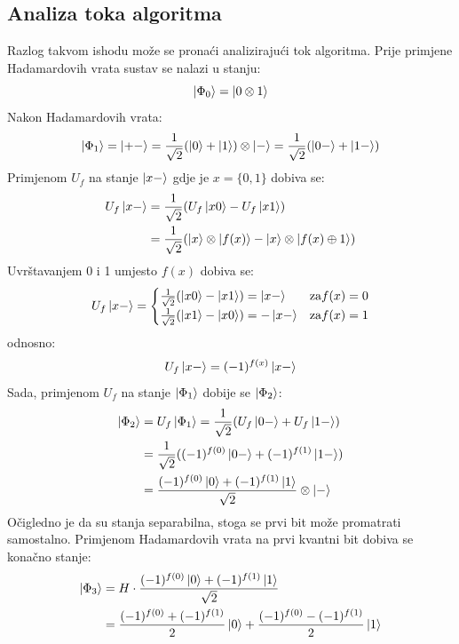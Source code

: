 \subsection{Analiza toka algoritma}
Razlog takvom ishodu može se pronaći analizirajući tok algoritma. Prije primjene Hadamardovih vrata sustav se nalazi u stanju:
\begin{equation}
\ket{\Phi_0} = \ket{0\otimes 1}
\end{equation}
Nakon Hadamardovih vrata:
\begin{equation}
\ket{\Phi_1} = \ket{+-} = \frac{1}{\sqrt{2}}(\ket{0} + \ket{1})\otimes\ket{-}
= \frac{1}{\sqrt{2}}(\ket{0-} + \ket{1-})
\end{equation}
Primjenom $U_f$ na stanje $\ket{x-}$ gdje je $x = \{0, 1\}$ dobiva se:
\begin{equation}
\begin{aligned}
U_f\ket{x-} &= \frac{1}{\sqrt{2}}(U_f\ket{x0} - U_f\ket{x1}) \\
&= \frac{1}{\sqrt{2}}(\ket{x}\otimes\ket{f(x)} - \ket{x}\otimes\ket{f(x)\oplus 1})
\end{aligned}
\end{equation}
Uvrštavanjem 0 i 1 umjesto $f(x)$ dobiva se:
\begin{equation}
U_f\ket{x-} =
\begin{cases}
\frac{1}{\sqrt{2}}(\ket{x0} - \ket{x1}) = \ket{x-} & \text{za} f(x) = 0 \\
\frac{1}{\sqrt{2}}(\ket{x1} - \ket{x0}) = -\ket{x-} & \text{za} f(x) = 1
\end{cases}
\end{equation}
odnosno:
\begin{equation}
U_f\ket{x-} = (-1)^{f(x)}\ket{x-}
\end{equation}
Sada, primjenom $U_f$ na stanje $\ket{\Phi_1}$ dobije se $\ket{\Phi_2}$:
\begin{equation}
\begin{aligned}
\ket{\Phi_2} &= U_f\ket{\Phi_1} = \frac{1}{\sqrt{2}}(U_f\ket{0-}+U_f\ket{1-}) \\
&= \frac{1}{\sqrt{2}}((-1)^{f(0)}\ket{0-} + (-1)^{f(1)}\ket{1-}) \\
&= \frac{(-1)^{f(0)}\ket{0} + (-1)^{f(1)}\ket{1}}{\sqrt{2}}\otimes\ket{-}
\end{aligned}
\end{equation}
Očigledno je da su stanja separabilna, stoga se prvi bit može promatrati samostalno. Primjenom Hadamardovih vrata na prvi kvantni bit dobiva se konačno stanje:
\begin{equation}
\begin{aligned}
\ket{\Phi_3} &= H\cdot \frac{(-1)^{f(0)}\ket{0} + (-1)^{f(1)}\ket{1}}{\sqrt{2}} \\
&= \frac{(-1)^{f(0)}+(-1)^{f(1)}}{2}\ket{0} + \frac{(-1)^{f(0)}-(-1)^{f(1)}}{2}\ket{1}
\end{aligned}
\end{equation}
